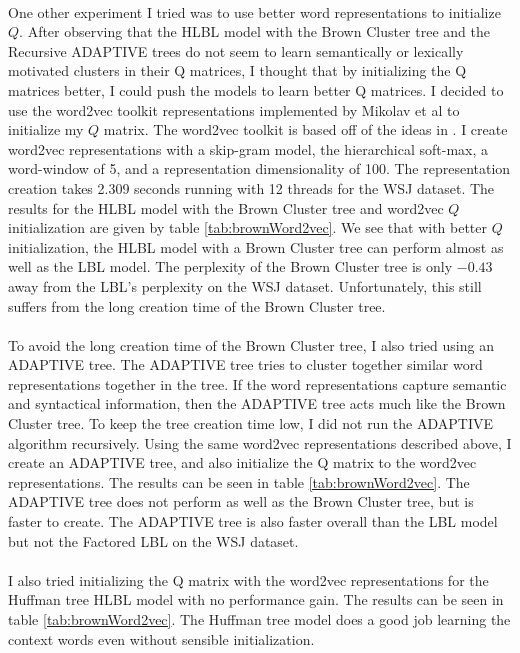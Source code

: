 \paragraph{}
One other experiment I tried was to use better word representations to initialize $Q$. After observing that the HLBL model with the Brown Cluster tree and the Recursive ADAPTIVE trees do not seem to learn semantically or lexically motivated clusters in their Q matrices, I thought that by initializing the Q matrices better, I could push the models to learn better Q matrices. I decided to use the word2vec toolkit representations implemented by Mikolav et al to initialize my $Q$ matrix. The word2vec toolkit is based off of the ideas in \cite{Mikolov2013}. I create word2vec representations with a skip-gram model, the hierarchical soft-max, a word-window of 5, and a representation dimensionality of 100. The representation creation takes 2.309 seconds running with 12 threads for the WSJ dataset. The results for the HLBL model with the Brown Cluster tree and word2vec $Q$ initialization are given by table \ref{tab:brownWord2vec}. We see that with better $Q$ initialization, the HLBL model with a Brown Cluster tree can perform almost as well as the LBL model. The perplexity of the Brown Cluster tree is only $-0.43$ away from the LBL's perplexity on the WSJ dataset. Unfortunately, this still suffers from the long creation time of the Brown Cluster tree.
\paragraph{}
To avoid the long creation time of the Brown Cluster tree, I also tried using an ADAPTIVE tree. The ADAPTIVE tree tries to cluster together similar word representations together in the tree. If the word representations capture semantic and syntactical information, then the ADAPTIVE tree acts much like the Brown Cluster tree. To keep the tree creation time low, I did not run the ADAPTIVE algorithm recursively. Using the same word2vec representations described above, I create an ADAPTIVE tree, and also initialize the Q matrix to the word2vec representations. The results can be seen in table \ref{tab:brownWord2vec}. The ADAPTIVE tree does not perform as well as the Brown Cluster tree, but is faster to create. The ADAPTIVE tree is also faster overall than the LBL model but not the Factored LBL on the WSJ dataset.

\paragraph{}
I also tried initializing the Q matrix with the word2vec representations for the Huffman tree HLBL model with no performance gain. The results can be seen in table \ref{tab:brownWord2vec}. The Huffman tree model does a good job learning the context words even without sensible initialization. 

